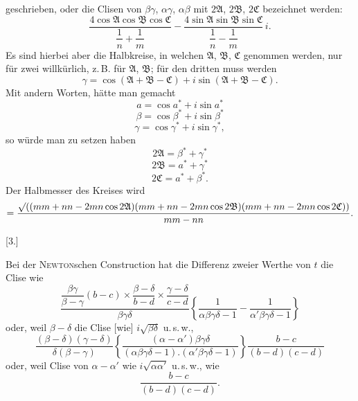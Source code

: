 %
geschrieben, oder die Clisen von $\beta\gamma$, $\alpha\gamma$, $\alpha\beta$ mit $2\mathfrak{A}$, $2\mathfrak{B}$, $2\mathfrak{C}$ bezeichnet werden:
\[
\frac{4\cos\mathfrak{A}\cos\mathfrak{B}\cos\mathfrak{C}}{\dfrac{1}{n}+\dfrac{1}{m}} - \frac{4\sin\mathfrak{A}\sin\mathfrak{B}\sin\mathfrak{C}}{\dfrac{1}{n}-\dfrac{1}{m}}\, i.
\]
Es sind hierbei aber die Halbkreise, in welchen $\mathfrak{A}$, $\mathfrak{B}$, $\mathfrak{C}$ genommen werden, nur für zwei willkürlich, z.\,B. für $\mathfrak{A}$, $\mathfrak{B}$; für den dritten muss werden
\[
\gamma = \cos(\mathfrak{A}+\mathfrak{B}-\mathfrak{C}) + i\sin(\mathfrak{A}+\mathfrak{B}-\mathfrak{C}).
\]
Mit andern Worten, hätte man gemacht
\[
a = \cos a^{*} + i\sin a^{*}
\]
\[
\beta = \cos \beta^{*} + i\sin \beta^{*}
\]
\[
\gamma = \cos \gamma^{*} + i\sin \gamma^{*},
\]
so würde man zu setzen haben
\[
2\mathfrak{A} = \beta^{*}+\gamma^{*}
\]
\[
2\mathfrak{B} = a^{*}+\gamma^{*}
\]
\[
2\mathfrak{C} = a^{*}+\beta^{*}.
\]
Der Halbmesser des Kreises wird
\begingroup\small
\[
= \frac{\mathord{\surd}((mm+nn-2mn\cos 2\mathfrak{A})(mm+nn-2mn\cos 2\mathfrak{B})(mm+nn-2mn\cos 2\mathfrak{C}))}{mm-nn}.
\]
\endgroup

\begin{center}[3.]\end{center}

Bei der \textsc{Newton}schen Construction hat die Differenz zweier Werthe von $t$ die Clise wie
\[
\frac{\dfrac{\beta\gamma}{\beta-\gamma}(b-c)\times\dfrac{\beta-\delta}{b-d}\times\dfrac{\gamma-\delta}{c-d}}{\beta\gamma\delta}
\left\{\frac{1}{\alpha\beta\gamma\delta-1}-\frac{1}{\alpha'\beta\gamma\delta-1}\right\}
\]
oder, weil $\beta-\delta$ die Clise [wie] $i\sqrt{\beta\delta}$ u.\,s.\,w.,
\[
\frac{(\beta-\delta)(\gamma-\delta)}{\delta(\beta-\gamma)}
\left\{\frac{(\alpha-\alpha')\beta\gamma\delta}{(\alpha\beta\gamma\delta-1).(\alpha'\beta\gamma\delta-1)}\right\}
\frac{b-c}{(b-d)(c-d)}
\]
oder, weil Clise von $\alpha-\alpha'$ wie $i\sqrt{\alpha\alpha'}$ u.\,s.\,w., wie
\[
\frac{b-c}{(b-d)(c-d)}.
\]
